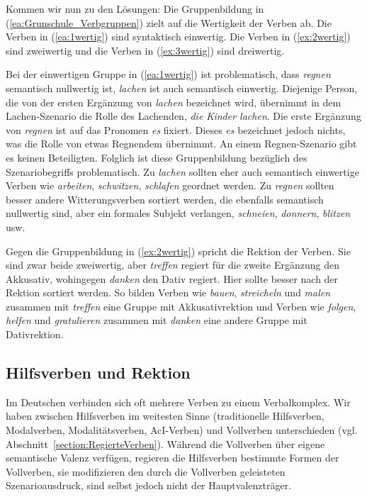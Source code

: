 Kommen wir nun zu den Lösungen: Die Gruppenbildung in (\ref{ea:Grunschule_Verbgruppen}) zielt auf die Wertigkeit der Verben ab. Die Verben in (\ref{ea:1wertig}) sind syntaktisch einwertig. Die Verben in (\ref{ex:2wertig}) sind zweiwertig und die Verben in (\ref{ex:3wertig}) sind dreiwertig. 

Bei der einwertigen Gruppe in (\ref{ea:1wertig}) ist problematisch, dass \textit{regnen} semantisch nullwertig ist, \textit{lachen} ist auch semantisch einwertig. Diejenige Person, die von der ersten Ergänzung von \textit{lachen} bezeichnet wird, übernimmt in dem Lachen-Szenario die Rolle des Lachenden, \zB \textit{die Kinder lachen}. Die erste Ergänzung von \textit{regnen} ist auf das Pronomen \textit{es} fixiert. Dieses \textit{es} bezeichnet jedoch nichts, was die Rolle von etwas Regnendem übernimmt. An einem Regnen-Szenario gibt es keinen Beteiligten. Folglich ist diese Gruppenbildung bezüglich des Szenariobegriffs problematisch. Zu \textit{lachen} sollten eher auch semantisch einwertige Verben wie \textit{arbeiten}, \textit{schwitzen}, \textit{schlafen} geordnet werden. Zu \textit{regnen} sollten besser andere Witterungsverben sortiert werden, die ebenfalls semantisch nullwertig sind, aber ein formales Subjekt verlangen, \zB \textit{schneien}, \textit{donnern}, \textit{blitzen} usw. 

Gegen die Gruppenbildung in (\ref{ex:2wertig}) spricht die Rektion der Verben. Sie sind zwar beide zweiwertig, aber \textit{treffen} regiert für die zweite Ergänzung den Akkusativ, wohingegen \textit{danken} den Dativ regiert. Hier sollte besser nach der Rektion sortiert werden. So bilden Verben wie \textit{bauen}, \textit{streicheln} und \textit{malen} zusammen mit \textit{treffen} eine Gruppe mit Akkusativrektion und Verben wie \textit{folgen}, \textit{helfen} und \textit{gratulieren} zusammen mit \textit{danken} eine andere Gruppe mit Dativrektion.   


\subsection{Hilfsverben und Rektion}\label{subsection:Valenz4}

Im Deutschen verbinden sich oft mehrere Verben zu einem Verbalkomplex. Wir haben zwischen Hilfsverben im weitesten Sinne (traditionelle Hilfsverben, Modalverben, Modalitätsverben, AcI-Verben) und Vollverben unterschieden (vgl. Abschnitt~\ref{section:RegierteVerben}). Während die Vollverben über eigene semantische Valenz verfügen, regieren die Hilfsverben bestimmte Formen der Vollverben, sie modifizieren den durch die Vollverben geleisteten Szenarioausdruck, sind selbst jedoch nicht der Hauptvalenzträger.

